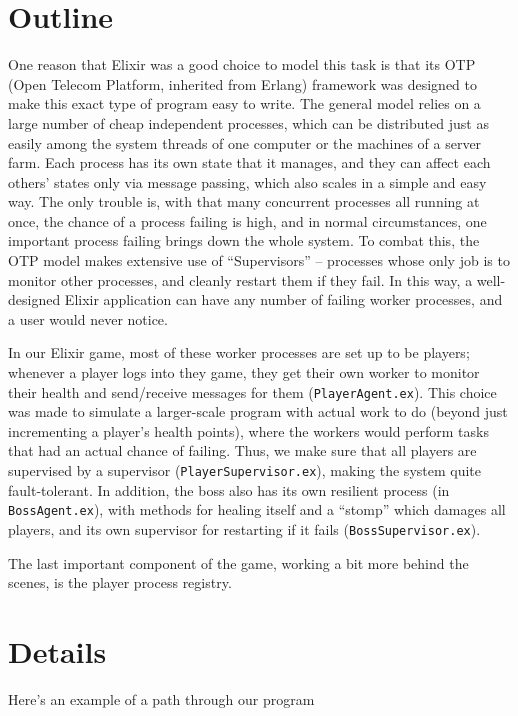\documentclass[letterpaper]{article}
\begin{document}
	\section{Outline}

	One reason that Elixir was a good choice to model this task is that its OTP (Open Telecom Platform, inherited from Erlang) framework was designed to make this exact type of program easy to write. The general model relies on a large number of cheap independent processes, which can be distributed just as easily among the system threads of one computer or the machines of a server farm. Each process has its own state that it manages, and they can affect each others' states only via message passing, which also scales in a simple and easy way. The only trouble is, with that many concurrent processes all running at once, the chance of a process failing is high, and in normal circumstances, one important process failing brings down the whole system. To combat this, the OTP model makes extensive use of ``Supervisors'' -- processes whose only job is to monitor other processes, and cleanly restart them if they fail. In this way, a well-designed Elixir application can have any number of failing worker processes, and a user would never notice.

	In our Elixir game, most of these worker processes are set up to be players; whenever a player logs into they game, they get their own worker to monitor their health and send/receive messages for them (\texttt{PlayerAgent.ex}). This choice was made to simulate a larger-scale program with actual work to do (beyond just incrementing a player's health points), where the workers would perform tasks that had an actual chance of failing. Thus, we make sure that all players are supervised by a supervisor (\texttt{PlayerSupervisor.ex}), making the system quite fault-tolerant. In addition, the boss also has its own resilient process (in \texttt{BossAgent.ex}), with methods for healing itself and a ``stomp'' which damages all players, and its own supervisor for restarting if it fails (\texttt{BossSupervisor.ex}).

	The last important component of the game, working a bit more behind the scenes, is the player process registry.

	\section{Details}

	Here's an example of a path through our program
\end{document}
